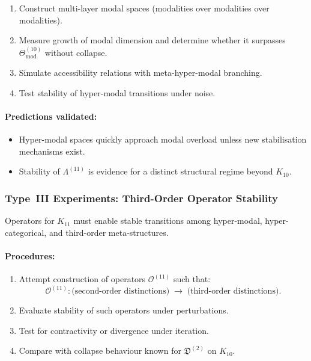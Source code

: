 \begin{enumerate}
    \item Construct multi-layer modal spaces 
          (modalities over modalities over modalities).
    \item Measure growth of modal dimension and 
          determine whether it surpasses 
          $\Theta_{\mathrm{mod}}^{(10)}$ without collapse.
    \item Simulate accessibility relations with 
          meta-hyper-modal branching.
    \item Test stability of hyper-modal transitions under noise.
\end{enumerate}

\paragraph{Predictions validated:}

\begin{itemize}
    \item Hyper-modal spaces quickly approach modal overload unless 
          new stabilisation mechanisms exist.
    \item Stability of $\Lambda^{(11)}$ is evidence for a 
          distinct structural regime beyond $K_{10}$.
\end{itemize}



\subsubsection{Type~III Experiments: Third-Order Operator Stability}

Operators for $K_{11}$ must enable stable transitions among 
hyper-modal, hyper-categorical, and third-order meta-structures.

\paragraph{Procedures:}

\begin{enumerate}
    \item Attempt construction of operators $\mathcal{O}^{(11)}$ 
          such that:
          \[
              \mathcal{O}^{(11)} :
              \text{(second-order distinctions)}
                 \;\longrightarrow\;
              \text{(third-order distinctions)}.
          \]
    \item Evaluate stability of such operators under perturbations.
    \item Test for contractivity or divergence under iteration.
    \item Compare with collapse behaviour known for 
          $\mathfrak{D}^{(2)}$ on $K_{10}$.
\end{enumerate}

